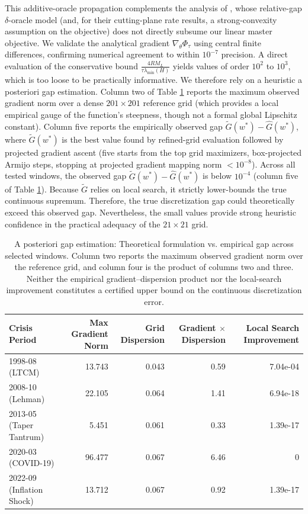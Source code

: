 \documentclass[smallextended]{svjour3}
\begin{document}
This additive-oracle propagation complements the analysis of \citet{oustry2025convex}, whose relative-gap $\delta$-oracle model (and, for their cutting-plane rate results, a strong-convexity assumption on the objective) does not directly subsume our linear master objective. We validate the analytical gradient $\nabla_\theta \Phi_\tau$ using central finite differences, confirming numerical agreement to within $10^{-7}$ precision. A direct evaluation of the conservative bound $\frac{4RM_L}{\tau\lambda_{\min}(H)}$ yields values of order $10^{2}$ to $10^{3}$, which is too loose to be practically informative. We therefore rely on a heuristic a posteriori gap estimation. Column two of Table \ref{tab:gap_verification} reports the maximum observed gradient norm over a dense $201\times201$ reference grid (which provides a local empirical gauge of the function's steepness, though not a formal global Lipschitz constant). Column five reports the empirically observed gap $\widetilde G(w^*) - \widehat G(w^*)$, where $\widetilde G(w^*)$ is the best value found by refined-grid evaluation followed by projected gradient ascent (five starts from the top grid maximizers, box-projected Armijo steps, stopping at projected gradient mapping norm $<10^{-8}$). Across all tested windows, the observed gap $\widetilde G(w^*) - \widehat G(w^*)$ is below $10^{-4}$ (column five of Table \ref{tab:gap_verification}). Because $\widetilde G$ relies on local search, it strictly lower-bounds the true continuous supremum. Therefore, the true discretization gap could theoretically exceed this observed gap. Nevertheless, the small values provide strong heuristic confidence in the practical adequacy of the $21\times21$ grid.

\begin{table}[htbp]
\centering
\caption{A posteriori gap estimation: Theoretical formulation vs. empirical gap across selected windows. Column two reports the maximum observed gradient norm over the reference grid, and column four is the product of columns two and three. Neither the empirical gradient--dispersion product nor the local-search improvement constitutes a certified upper bound on the continuous discretization error.}
\label{tab:gap_verification}
\begin{tabular}{lrrrr}
\toprule
\textbf{Crisis Period} & \textbf{Max Gradient Norm} & \textbf{Grid Dispersion} & \textbf{Gradient $\times$ Dispersion} & \textbf{Local Search Improvement} \\
\midrule
1998-08 (LTCM) & 13.743 & 0.043 & 0.59 & 7.04e-04 \\
2008-10 (Lehman) & 22.105 & 0.064 & 1.41 & 6.94e-18 \\
2013-05 (Taper Tantrum) & 5.451 & 0.061 & 0.33 & 1.39e-17 \\
2020-03 (COVID-19) & 96.477 & 0.067 & 6.46 & 0 \\
2022-09 (Inflation Shock) & 13.712 & 0.067 & 0.92 & 1.39e-17 \\
\bottomrule
\end{tabular}
\end{table}
\end{document}
